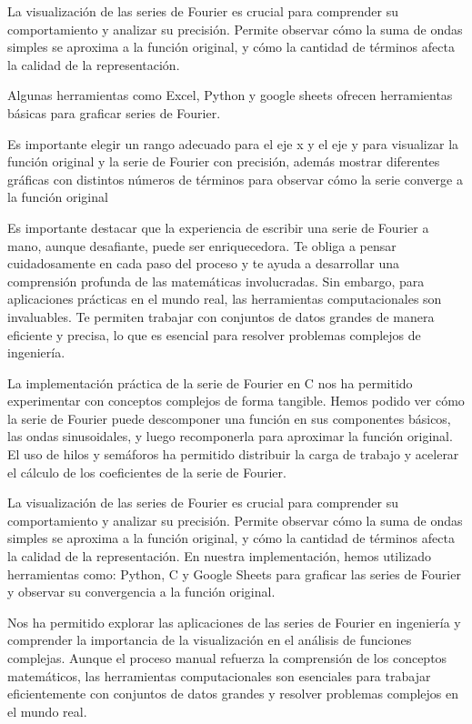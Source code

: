 La visualización de las series de Fourier es crucial para comprender su comportamiento y analizar su precisión. Permite observar cómo la suma de ondas simples se aproxima a la función original, y cómo la cantidad de términos afecta la calidad de la representación.

Algunas herramientas como Excel, Python y google sheets ofrecen herramientas básicas para graficar series de Fourier.

Es importante elegir un rango adecuado para el eje x y el eje y para visualizar la función original y la serie de Fourier con precisión, además mostrar diferentes gráficas con distintos números de términos para observar cómo la serie converge a la función original

Es importante destacar que la experiencia de escribir una serie de Fourier a mano, aunque desafiante, puede ser enriquecedora. Te obliga a pensar cuidadosamente en cada paso del proceso y te ayuda a desarrollar una comprensión profunda de las matemáticas involucradas. Sin embargo, para aplicaciones prácticas en el mundo real, las herramientas computacionales son invaluables. Te permiten trabajar con conjuntos de datos grandes de manera eficiente y precisa, lo que es esencial para resolver problemas complejos de ingeniería.

La implementación práctica de la serie de Fourier en C nos ha permitido experimentar con conceptos complejos de forma tangible. Hemos podido ver cómo la serie de Fourier puede descomponer una función en sus componentes básicos, las ondas sinusoidales, y luego recomponerla para aproximar la función original. El uso de hilos y semáforos ha permitido distribuir la carga de trabajo y acelerar el cálculo de los coeficientes de la serie de Fourier.

La visualización de las series de Fourier es crucial para comprender su comportamiento y analizar su precisión. Permite observar cómo la suma de ondas simples se aproxima a la función original, y cómo la cantidad de términos afecta la calidad de la representación. En nuestra implementación, hemos utilizado herramientas como: Python, C y Google Sheets para graficar las series de Fourier y observar su convergencia a la función original.

Nos ha permitido explorar las aplicaciones de las series de Fourier en ingeniería y comprender la importancia de la visualización en el análisis de funciones complejas. Aunque el proceso manual refuerza la comprensión de los conceptos matemáticos, las herramientas computacionales son esenciales para trabajar eficientemente con conjuntos de datos grandes y resolver problemas complejos en el mundo real.

